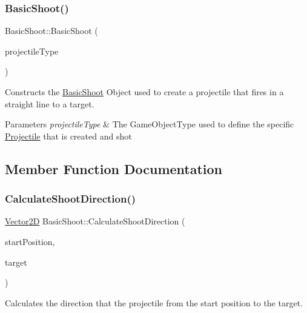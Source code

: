 \subsubsection{\texorpdfstring{Basic\+Shoot()}{BasicShoot()}}
{\footnotesize\ttfamily Basic\+Shoot\+::\+Basic\+Shoot (\begin{DoxyParamCaption}\item[{Game\+Object\+Type}]{projectile\+Type }\end{DoxyParamCaption})}



Constructs the \hyperlink{class_basic_shoot}{Basic\+Shoot} Object used to create a projectile that fires in a straight line to a target. 


\begin{DoxyParams}{Parameters}
{\em projectile\+Type} & The Game\+Object\+Type used to define the specific \hyperlink{class_projectile}{Projectile} that is created and shot \\
\hline
\end{DoxyParams}


\subsection{Member Function Documentation}
\mbox{\label{class_basic_shoot_aafe1225544d200da3e0c084d33dac60a}} 
\subsubsection{\texorpdfstring{Calculate\+Shoot\+Direction()}{CalculateShootDirection()}}
{\footnotesize\ttfamily \hyperlink{class_vector2_d}{Vector2D} Basic\+Shoot\+::\+Calculate\+Shoot\+Direction (\begin{DoxyParamCaption}\item[{\hyperlink{class_vector2_d}{Vector2D}}]{start\+Position,  }\item[{\hyperlink{class_vector2_d}{Vector2D}}]{target }\end{DoxyParamCaption})\hspace{0.3cm}{\ttfamily [private]}}



Calculates the direction that the projectile from the start position to the target. 


